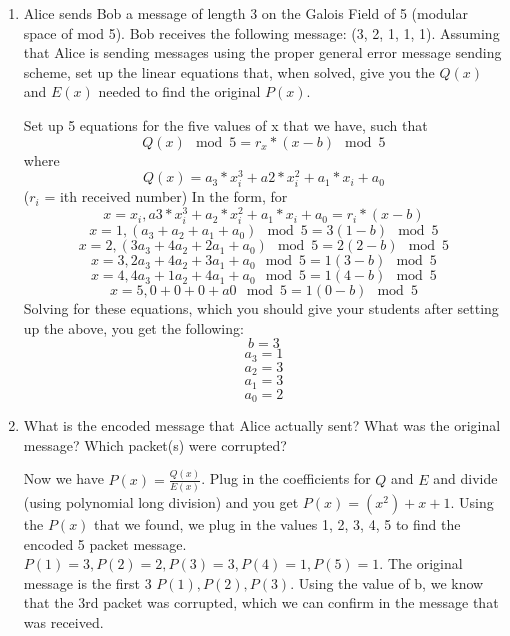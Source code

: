 \question \begin{enumerate}[label=(\alph*)]
\item Alice sends Bob a message of length 3 on the Galois Field of 
5 (modular space of mod 5). Bob receives the following message: 
(3, 2, 1, 1, 1). Assuming that Alice is sending messages using the 
proper general error message sending scheme, set up the linear equations 
that, when solved, give you the $Q(x)$ and $E(x)$ needed to find the 
original $P(x)$.
\begin{solution}[3in]
Set up 5 equations for the five values of x that we have, such that 
\[Q(x) \mod 5 = r_{x}*(x-b) \mod 5\] 
where 
\[Q(x)= a_3*x_i^3 + a2*x_i^2 + a_1*x_i + a_0\]
($r_i$ = ith received number)\newline
In the form, for 
\[x = x_i, a3*x_i^3 + a_2*x_i^2 + a_1*x_i + a_0 = r_i*(x - b)\]
\[x=1, (a_3 + a_2 + a_1 + a_0) \mod 5 = 3(1 - b) \mod 5\]
\[x=2, (3a_3 + 4a_2 + 2a_1 + a_0) \mod 5 = 2(2 -b) \mod 5\]
\[x=3, 2a_3 + 4a_2 + 3a_1 + a_0 \mod 5=  1(3 - b) \mod 5\]
\[x=4,  4a_3 + 1a_2 + 4a_1 + a_0 \mod 5=  1(4 - b) \mod 5\]
\[x=5, 0 + 0 + 0 + a0 \mod 5 = 1(0 - b) \mod 5\]
Solving for these equations, which you should give your students after 
setting up the above, you get the following:
\[b = 3\]
\[a_3 = 1\]
\[a_2 = 3\]
\[a_1 = 3\]
\[a_0 = 2\]
\end{solution}
\item What is the encoded message that Alice actually sent? What was the 
original message? Which packet(s) were corrupted?
\begin{solution}[2 in]
Now we have $P(x) = \frac{Q(x)}{E(x)}$. Plug in the coefficients for 
$Q$ and $E$ and divide (using polynomial long division) and you get 
$P(x) = (x^2) + x + 1$.
Using the $P(x)$ that we found, we plug in the values 1, 2, 3, 4, 5 
to find the encoded 5 packet message. $P(1) = 3, P(2) = 2, P(3) = 3, 
P(4) = 1, P(5) = 1$. The original message is the first 3 $P(1), P(2), 
P(3)$. Using the value of b, we know that the 3rd packet was corrupted, 
which we can confirm in the message that was received.
\end{solution}
\end{enumerate}